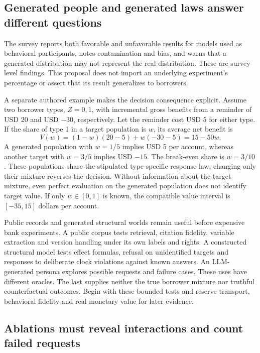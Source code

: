 \subsection{Generated people and generated laws answer different questions}

The survey reports both favorable and unfavorable results for models used as
behavioral participants, notes contamination and bias, and warns that a generated
distribution may not represent the real distribution. These are survey-level
findings. This proposal does not import an underlying experiment's percentage
or assert that its result generalizes to borrowers.
\citep{exec24_llmchallenges_original}

A separate authored example makes the decision consequence explicit. Assume two
borrower types, $Z=0,1$, with incremental gross benefits from a reminder of USD 20
and USD $-30$, respectively. Let the reminder cost USD 5 for either type. If the
share of type 1 in a target population is $w$, its average net benefit is
\[
 V(w)=(1-w)(20-5)+w(-30-5)=15-50w.
\]
A generated population with $w=1/5$ implies USD 5 per account, whereas another
target with $w=3/5$ implies USD $-15$. The break-even share is $w=3/10$.
These populations share the stipulated type-specific response law; changing only
their mixture reverses the decision. Without information about the target
mixture, even perfect evaluation on the generated population does not identify
target value. If only $w\in[0,1]$ is known, the compatible value interval is
$[-35,15]$ dollars per account.~\citep{exec24_llmchallenges_reference}

Public records and generated structural worlds remain useful before expensive
bank experiments. A public corpus tests retrieval, citation fidelity, variable
extraction and version handling under its own labels and rights. A constructed
structural model tests effect formulas, refusal on unidentified targets and
responses to deliberate clock violations against known answers. An LLM-generated
persona explores possible requests and failure cases. These uses have different
oracles. The last supplies neither the true borrower mixture nor truthful
counterfactual outcomes. Begin with these bounded tests and reserve transport,
behavioral fidelity and real monetary value for later evidence.

\subsection{Ablations must reveal interactions and count failed requests}

